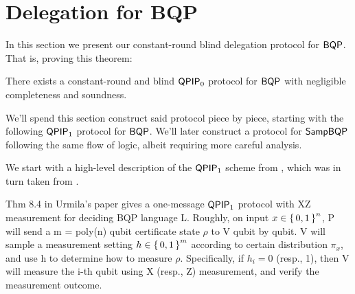 \section{Delegation for BQP}
\label{sec:BlindBQP}







In this section we present our constant-round blind delegation protocol for $\operatorname{\mathsf{BQP}}$. That is, proving this theorem:
\begin{thm}
	\label{thm:QPIP0BQP}
	There exists a constant-round and blind $\operatorname{\mathsf{QPIP}}_0$ protocol for $\operatorname{\mathsf{BQP}}$ with negligible completeness and soundness.
\end{thm}
We'll spend this section construct said protocol piece by piece, starting with the following $\operatorname{\mathsf{QPIP}}_1$ protocol for $\operatorname{\mathsf{BQP}}$.
We'll later construct a protocol for $\operatorname{\mathsf{SampBQP}}$ following the same flow of logic, albeit requiring more careful analysis.

We start with a high-level description of the $\operatorname{\mathsf{QPIP}}_1$ scheme from \cite{mahadev_delegation}, which was in turn taken from \cite{mf16}.

Thm 8.4 in Urmila's paper gives a one-message $\operatorname{\mathsf{QPIP}}_1$ protocol with XZ measurement for deciding BQP language L.
Roughly, on input $x \in\set{0,1}^n$,  P will send a m = poly(n) qubit certificate state $\rho$ to V qubit by qubit.
V will sample a measurement setting $h \in \set{0,1}^m$ according to certain distribution $\pi_x$, and use h to determine how to measure $\rho$.
Specifically, if $h_i = 0$ (resp., 1), then V will measure the i-th qubit using  X (resp., Z) measurement, and verify the measurement outcome.


